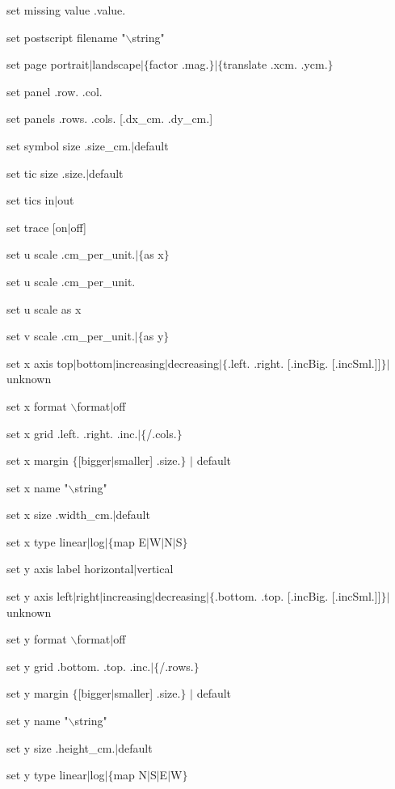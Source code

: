 set missing value .value.

set postscript filename "$\backslash$string"

set page portrait$\mid$landscape$\mid$$\lbrace$factor .mag.$\rbrace$$\mid$$\lbrace$translate .xcm. .ycm.$\rbrace$

set panel .row. .col.

set panels .rows. .cols. [.dx\_cm. .dy\_cm.]

set symbol size .size\_cm.$\mid$default

set tic size .size.$\mid$default

set tics in$\mid$out

set trace [on$\mid$off]

set u scale .cm\_per\_unit.$\mid$$\lbrace$as x$\rbrace$

set u scale .cm\_per\_unit.

set u scale as x

set v scale .cm\_per\_unit.$\mid$$\lbrace$as y$\rbrace$

set x axis top$\mid$bottom$\mid$increasing$\mid$decreasing$\mid$$\lbrace$.left. .right. [.incBig. [.incSml.]]$\rbrace$$\mid$unknown

set x format $\backslash$format$\mid$off

set x grid .left. .right. .inc.$\mid$$\lbrace$/.cols.$\rbrace$

set x margin $\lbrace$[bigger$\mid$smaller] .size.$\rbrace$ $\mid$ default

set x name "$\backslash$string"

set x size .width\_cm.$\mid$default

set x type linear$\mid$log$\mid$$\lbrace$map E$\mid$W$\mid$N$\mid$S$\rbrace$

set y axis label horizontal$\mid$vertical

set y axis left$\mid$right$\mid$increasing$\mid$decreasing$\mid$$\lbrace$.bottom. .top. [.incBig. [.incSml.]]$\rbrace$$\mid$unknown

set y format $\backslash$format$\mid$off

set y grid .bottom. .top. .inc.$\mid$$\lbrace$/.rows.$\rbrace$

set y margin $\lbrace$[bigger$\mid$smaller] .size.$\rbrace$ $\mid$ default

set y name "$\backslash$string"

set y size .height\_cm.$\mid$default

set y type linear$\mid$log$\mid$$\lbrace$map N$\mid$S$\mid$E$\mid$W$\rbrace$

